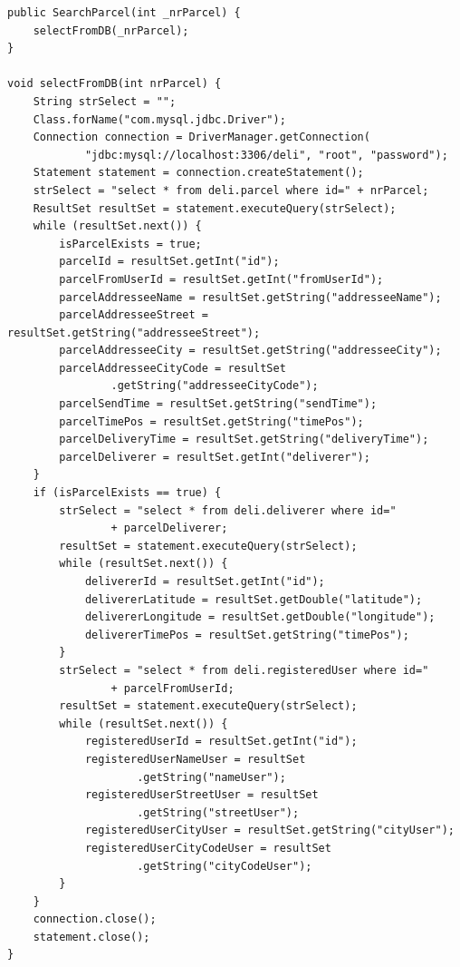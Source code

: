 \documentclass[eng,printmode,oneside]{mgr}
\begin{document}
\begin{lstlisting}[caption=Klasa SearchParcel.java przedstawiona metoda
selectFromDB()\, która reprezentuje połączenie z bazą danych oraz pobiera
wszystkie dane o przesyłce,label=lst:SearchParcel.selectFromDB.java]
public SearchParcel(int _nrParcel) {
	selectFromDB(_nrParcel); 
}

void selectFromDB(int nrParcel) {
	String strSelect = "";
	Class.forName("com.mysql.jdbc.Driver");
	Connection connection = DriverManager.getConnection(
			"jdbc:mysql://localhost:3306/deli", "root", "password");
	Statement statement = connection.createStatement();
	strSelect = "select * from deli.parcel where id=" + nrParcel;
	ResultSet resultSet = statement.executeQuery(strSelect);
	while (resultSet.next()) {
		isParcelExists = true;
		parcelId = resultSet.getInt("id");
		parcelFromUserId = resultSet.getInt("fromUserId");
		parcelAddresseeName = resultSet.getString("addresseeName");
		parcelAddresseeStreet = resultSet.getString("addresseeStreet");
		parcelAddresseeCity = resultSet.getString("addresseeCity");
		parcelAddresseeCityCode = resultSet
				.getString("addresseeCityCode");
		parcelSendTime = resultSet.getString("sendTime");
		parcelTimePos = resultSet.getString("timePos");
		parcelDeliveryTime = resultSet.getString("deliveryTime");
		parcelDeliverer = resultSet.getInt("deliverer");
	}
	if (isParcelExists == true) {
		strSelect = "select * from deli.deliverer where id="
				+ parcelDeliverer;
		resultSet = statement.executeQuery(strSelect);
		while (resultSet.next()) {
			delivererId = resultSet.getInt("id");
			delivererLatitude = resultSet.getDouble("latitude");
			delivererLongitude = resultSet.getDouble("longitude");
			delivererTimePos = resultSet.getString("timePos");
		}
		strSelect = "select * from deli.registeredUser where id="
				+ parcelFromUserId;
		resultSet = statement.executeQuery(strSelect);
		while (resultSet.next()) {
			registeredUserId = resultSet.getInt("id");
			registeredUserNameUser = resultSet
					.getString("nameUser");
			registeredUserStreetUser = resultSet
					.getString("streetUser");
			registeredUserCityUser = resultSet.getString("cityUser");
			registeredUserCityCodeUser = resultSet
					.getString("cityCodeUser");
		}
	}
	connection.close();
	statement.close();
}
\end{lstlisting}
\end{document}
